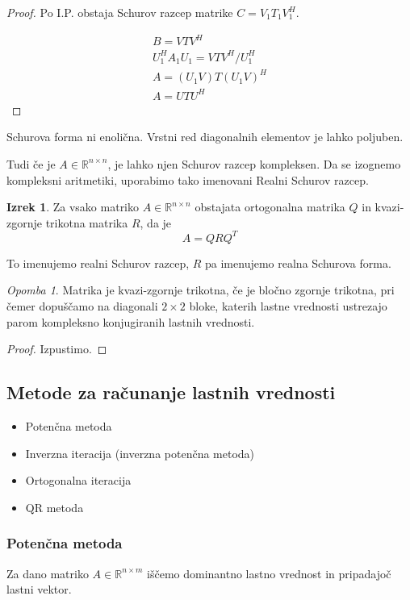 \documentclass[a4paper,12pt]{article}
\theoremstyle{definition}
\newtheorem{theorem}[counter]{Izrek}
\theoremstyle{remark}
\newtheorem*{rem}{Opomba}
\newcommand{\R}{\mathbb{R}}
\begin{document}
\begin{proof}
    Po I.P. obstaja Schurov razcep matrike $C = V_1 T_1 V_1^H$.

    \begin{gather*}
        B = V T V^H \\
        U_1^H A_1 U_1 = V T V^H /U_1^H \\
        A = (U_1 V) T (U_1 V)^H \\
        A = U T U^H
    \end{gather*}
\end{proof}

Schurova forma ni enolična. Vrstni red diagonalnih elementov je lahko poljuben.

Tudi če je $A \in \R^{n\times n}$, je lahko njen Schurov razcep kompleksen. Da se izognemo kompleksni aritmetiki, uporabimo tako imenovani Realni Schurov razcep.

\begin{theorem}
    Za vsako matriko $A \in \R^{n\times n}$ obstajata ortogonalna matrika $Q$ in kvazi-zgornje trikotna matrika $R$, da je
    \begin{equation*}
        A = QRQ^T
    \end{equation*}

    To imenujemo realni Schurov razcep, $R$ pa imenujemo realna Schurova forma.
\end{theorem}

\begin{rem}
    Matrika je kvazi-zgornje trikotna, če je bločno zgornje trikotna, pri čemer dopuščamo na diagonali $2 \times 2$ bloke, katerih lastne vrednosti
    ustrezajo parom kompleksno konjugiranih lastnih vrednosti.
\end{rem}

\begin{proof}
    Izpustimo.
\end{proof}

\subsection{Metode za računanje lastnih vrednosti}
\begin{itemize}
    \item Potenčna metoda
    \item Inverzna iteracija (inverzna potenčna metoda)
    \item Ortogonalna iteracija
    \item QR metoda
\end{itemize}

\subsubsection{Potenčna metoda}
Za dano matriko $A \in \R^{n \times m}$ iščemo dominantno lastno vrednost in pripadajoč lastni vektor.
\end{document}
